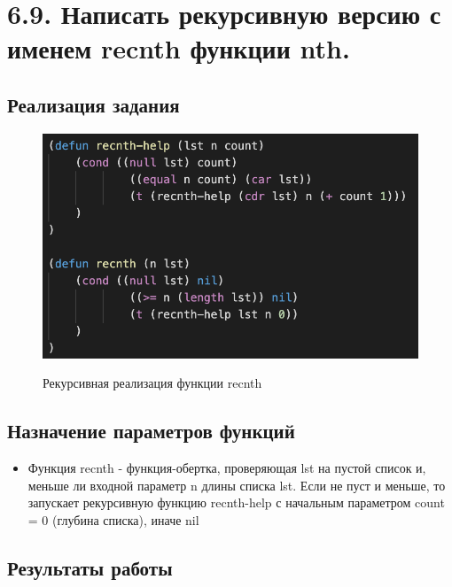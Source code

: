\documentclass[a4paper,12pt]{article}
\begin{document}
 	\newpage
 	
 	\section*{6.9. Написать рекурсивную версию с именем recnth функции nth. 
 	}
 	
 	\subsection*{Реализация задания}
 	
 	\begin{figure}[h!]
 		\begin{center}
 			{\includegraphics[scale = 1.0]{6.9.png}}
 			\label{ris:6.9}
 		\end{center}
 	\caption{Рекурсивная реализация функции recnth}
 	\end{figure}
 	
 	\subsection*{Назначение параметров функций}
 	
 	\begin{itemize}
 		\item Функция recnth - функция-обертка, проверяющая lst на пустой список и, меньше ли входной параметр n длины списка lst. Если не пуст и меньше, то запускает рекурсивную функцию recnth-help с начальным параметром count = 0 (глубина списка), иначе nil
 	\end{itemize}
 	
 	\subsection*{Результаты работы}
 	
\end{document}
